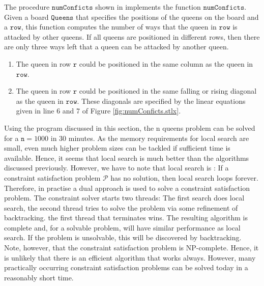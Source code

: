 The procedure $\texttt{numConficts}$ shown in  implements the function
$\texttt{numConficts}$.  Given a board $\texttt{Queens}$ that specifies the positions of the queens on the
board and a $\texttt{row}$, this function computes the number of ways that the queen in $\texttt{row}$ is
attacked by other queens.  If all queens are positioned in different rows, then there are only three ways left
that a queen can be attacked by another queen.
\begin{enumerate}
\item The queen in row $\texttt{r}$ could be positioned in the same column as the queen in $\texttt{row}$.
\item The queen in row $\texttt{r}$ could be positioned in the same falling or rising diagonal as the queen in
      $\texttt{row}$.  These diagonals are specified by the linear equations given in line 6 and 7 of Figure
      \ref{fig:numConficts.stlx}.
\end{enumerate}
Using the program discussed in this section, the n queens problem can be solved for a $\texttt{n} = 1000$ in
30 minutes.  As the memory requirements for local search are small, even much higher problem sizes can be
tackled if sufficient time is available.  Hence, it seems that local search is much better than the algorithms
discussed previously.  However, we have to note that local search is :  If a
constraint satisfaction problem $\mathcal{P}$ has no solution, then local search loops forever.  Therefore, in
practise a dual approach is used to solve a constraint satisfaction problem.  The constraint solver starts two
threads: The first search does local search, the second thread tries to solve the problem via some refinement
of backtracking.  the first thread that terminates wins.  The resulting algorithm is complete and, for a
solvable problem, will have similar performance as local search.  If the problem is unsolvable, this will
 be discovered by backtracking.  Note, however, that the constraint satisfaction
problem is NP-complete.  Hence, it is unlikely that there is an efficient algorithm that works always.
However, many practically occurring constraint satisfaction problems can be solved today in a reasonably short
time. 

